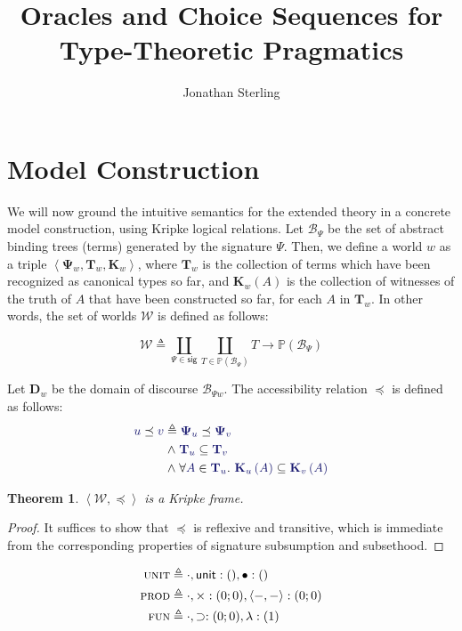 \documentclass[11pt]{amsart}
\newtheorem{thm}{Theorem}[section]
\theoremstyle{definition}
\theoremstyle{remark}
\numberwithin{equation}{section}
\def\InputModeColorName{MidnightBlue}
\newcommand\IMode[1]{{\color{\InputModeColorName}{#1}}}
\newcommand\Sig[1]{\mathbf{\Psi}_{#1}}
\newcommand\SigUnit{\textsc{unit}}
\newcommand\TyUnit{\mathsf{unit}}
\newcommand\PrecEq[2]{\IMode{#1}\preceq\IMode{#2}}
\newcommand\SigProd{\textsc{prod}}
\newcommand\TyProd[2]{#1\times #2}
\newcommand\Pair[2]{\left\langle #1, #2 \right\rangle}
\newcommand\SigFun{\textsc{fun}}
\newcommand\TyFun[2]{#1\supset #2}
\newcommand\Member[2]{\IMode{#1} \in \IMode{#2}}
\newcommand\Worlds{\mathcal{W}}
\newcommand\MkWorld[3]{\left\langle #1, #2, #3\right\rangle}
\newcommand\Pow[1]{\mathbb{P}\left(#1\right)}
\newcommand\Term[1]{\mathcal{B}_{#1}}
\newcommand\SubsetEq[2]{\IMode{#1}\subseteq\IMode{#2}}
\newcommand\Dom[1]{\mathbf{D}_{#1}}
\newcommand\Types[1]{\mathbf{T}_{#1}}
\newcommand\Witnesses[1]{\mathbf{K}_{#1}}
\newcommand\WitnessesOf[2]{\Witnesses{#1}\left(#2\right)}
\begin{document}
\title{Oracles and Choice Sequences for Type-Theoretic Pragmatics}

\author{Jonathan Sterling}
\address{}

\maketitle

\section{Model Construction}

We will now ground the intuitive semantics for the extended theory in a
concrete model construction, using Kripke logical relations.  Let $\Term\Psi$
be the set of abstract binding trees (terms) generated by the signature $\Psi$.
Then, we define a world $w$ as a triple
$\MkWorld{\Sig{w}}{\Types{w}}{\Witnesses{w}}$, where $\Types{w}$ is the
collection of terms which have been recognized as canonical types so far, and
$\WitnessesOf{w}{A}$ is the collection of witnesses of the truth of $A$ that have
been constructed so far, for each $A$ in $\Types{w}$. In other words, the set
of worlds $\Worlds$ is defined as follows:

\[
  \Worlds
    \triangleq
     \coprod_{\Psi\in \mathsf{sig}}
      \coprod_{T\in\Pow{\Term{\Psi}}}
       T\to\Pow{\Term\Psi}
\]

Let $\Dom{w}$ be the domain of discourse $\Term{\Psi{w}}$. The accessibility
relation $\preceq$ is defined as follows:
\begin{align*}
  \PrecEq{u}{v}
   &\triangleq
    \PrecEq{\Sig{u}}{\Sig{v}}\\
     &\mathrel\land
      \SubsetEq{\Types{u}}{\Types{v}}\\
       &\mathrel\land
        \forall\Member{A}{\Types{u}}.\ \SubsetEq{\WitnessesOf{u}{A}}{\WitnessesOf{v}{A}}
\end{align*}

\begin{thm}
  $\Pair{\Worlds}{\preceq}$ is a Kripke frame.
\end{thm}
\begin{proof}
  It suffices to show that $\preceq$ is reflexive and transitive, which is immediate from the corresponding properties of signature subsumption and subsethood.
\end{proof}

\begin{align*}
  \SigUnit
    &\triangleq
    \cdot, \TyUnit:(), \bullet:()\\
  \SigProd
    &\triangleq
    \cdot, \TyProd{}{}:(0;0), \Pair{-}{-}:(0;0)\\
  \SigFun
    &\triangleq
    \cdot, \TyFun{}{}:(0;0), \lambda:(1)\\
\end{align*}
\end{document}
